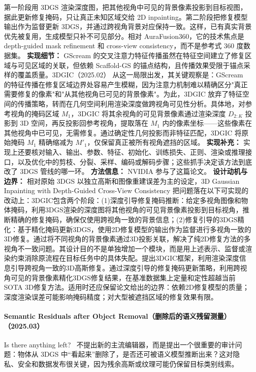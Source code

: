 第一阶段用 3DGS 渲染深度图，把其他视角中可见的背景像素投影到目标视图，据此更新修复掩码，只让真正未知区域交给 2D inpainting。第二阶段把修复模型输出作为监督更新 3DGS，并通过跨视角背景对应保持一致。这样，已有真实背景优先被复用，生成模型只补不可见部分。相对 AuraFusion360，它的技术焦点是 depth-guided mask refinement 和 cross-view consistency，而不是参考式 360 度数据集。
\textbf{实现细节：} GScream 的交叉注意力特征传播虽然在特征空间建立了修复区域与可见区域的关联，但依赖 Scaffold-GS 的锚点结构，且传播效果受限于锚点采样的覆盖质量。3DGIC（2025.02） 从这一局限出发，其关键观察是：GScream 的特征传播在修复区域边界处容易产生模糊，因为注意力机制难以精确区分"真正需要修复的像素"和"从其他视角已可见的背景像素"。为此，3DGIC 放弃了特征空间的传播策略，转而在几何空间利用渲染深度做跨视角可见性分析。具体地，对参考视角的掩码区域 $M_1$，3DGIC 将其余视角的可见背景像素通过渲染深度 $D_{2:K}$ 投影到 3D 空间，再反投影回参考视角，提取落在 $M_1$ 内的像素坐标——这些像素在其他视角中已可见，无需修复。通过确定性几何投影而非特征匹配，3DGIC 将原始掩码 $M_1$ 精确缩减为 $M'_1$，仅保留真正被所有视角遮挡的区域。
\textbf{实现补充：} 实现上还要核对输入、输出、参数、特征、初始化、训练损失、正则、渲染或推理接口，以及优化中的剪枝、分裂、采样、编码或解码步骤；这些抓手决定该方法到底改了 3DGS 管线的哪一环。
\textbf{方法信息：} NVIDIA 参与了这篇论文。
\textbf{设计动机与边界：} 相对原始 3DGS 以独立高斯和图像重建误差为主的设定，3D Gaussian Inpainting with Depth-Guided Cross-View Consistency 把问题落在以下可实现的改动上：3DGIC包含两个阶段：(1)深度引导修复掩码推断：给定多视角图像和物体掩码，利用3DGS渲染的深度图将其他视角的可见背景像素投影到目标视角，推断精确的修复掩码，确保仅使用跨视角一致的背景信息；(2)修复引导的3DGS精化：基于精化掩码更新3DGS，使用2D修复模型的输出作为监督进行多视角一致的3D修复。通过将不同视角的背景像素通过3D投影关联，解决了纯2D修复方法的多视角不一致问题。其设计目的不是单独增加一个模块，而是用上述表示、监督或渲染约束消除原流程在目标任务中的具体失配。提出3DGIC框架，利用渲染深度信息引导跨视角一致的3D高斯修复。通过深度引导的修复掩码更新策略，利用跨视角可见的背景像素精化3DGS修复结果，在基准数据集上定量和定性超越当前SOTA 3D修复方法。适用时还应保留论文给出的边界：依赖2D修复模型的质量；深度渲染误差可能影响掩码精度；对大型被遮挡区域的修复效果有限。
\paragraph{Semantic Residuals after Object Removal（删除后的语义残留测量）（2025.03）}
Is there anything left?~\cite{2503_17574} 不提出新的主流编辑器，而是提出一个很重要的审计问题：物体从 3DGS 中“看起来”删除了，是否还可被语义模型推断出来？这对隐私、安全和数据发布很关键，因为残余高斯或纹理可能仍保留目标类别线索。

